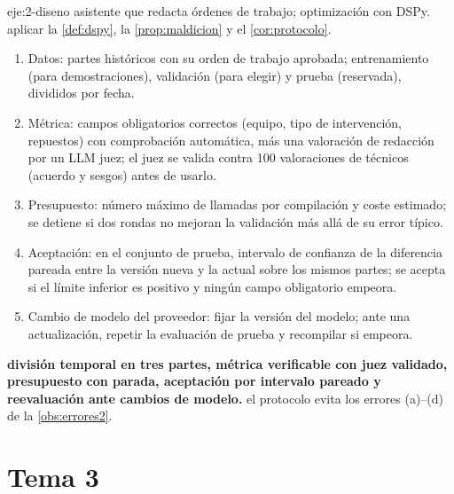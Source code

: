 \begin{solucion}{eje:2-diseno}
\datos asistente que redacta órdenes de trabajo; optimización con DSPy.
\planteamiento aplicar la \cref{def:dspy}, la \cref{prop:maldicion} y el \cref{cor:protocolo}.
\pasos
\begin{enumerate}[label=\arabic*.]
  \item Datos: partes históricos con su orden de trabajo aprobada; entrenamiento (para demostraciones), validación (para elegir) y prueba (reservada), divididos por fecha.
  \item Métrica: campos obligatorios correctos (equipo, tipo de intervención, repuestos) con comprobación automática, más una valoración de redacción por un LLM juez; el juez se valida contra 100 valoraciones de técnicos (acuerdo y sesgos) antes de usarlo.
  \item Presupuesto: número máximo de llamadas por compilación y coste estimado; se detiene si dos rondas no mejoran la validación más allá de su error típico.
  \item Aceptación: en el conjunto de prueba, intervalo de confianza de la diferencia pareada entre la versión nueva y la actual sobre los mismos partes; se acepta si el límite inferior es positivo y ningún campo obligatorio empeora.
  \item Cambio de modelo del proveedor: fijar la versión del modelo; ante una actualización, repetir la evaluación de prueba y recompilar si empeora.
\end{enumerate}
\resultado \textbf{división temporal en tres partes, métrica verificable con juez validado, presupuesto con parada, aceptación por intervalo pareado y reevaluación ante cambios de modelo.}
\comprobacion el protocolo evita los errores (a)--(d) de la \cref{obs:errores2}.
\end{solucion}

\section{Tema 3}

